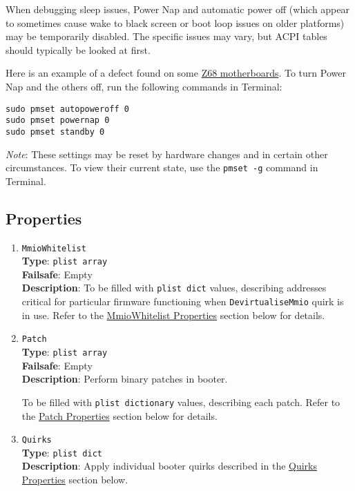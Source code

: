 \documentclass[]{article}
\begin{document}
When debugging sleep issues, Power Nap and automatic power off (which appear to sometimes cause
wake to black screen or boot loop issues on older platforms) may be temporarily disabled.
The specific issues may vary, but ACPI tables should typically be looked at first.

Here is an example of a defect found on some
\href{http://www.insanelymac.com/forum/topic/329624-need-cmos-reset-after-sleep-only-after-login/#entry2534645}{Z68 motherboards}.
To turn Power Nap and the others off, run the following commands in Terminal:
\begin{lstlisting}[label=powernap, style=ocbash]
sudo pmset autopoweroff 0
sudo pmset powernap 0
sudo pmset standby 0
\end{lstlisting}

\emph{Note}: These settings may be reset by hardware changes and in certain other circumstances.
To view their current state, use the \texttt{pmset -g} command in Terminal.

\subsection{Properties}\label{booterprops}

\begin{enumerate}

\item
  \texttt{MmioWhitelist}\\
  \textbf{Type}: \texttt{plist\ array}\\
  \textbf{Failsafe}: Empty\\
  \textbf{Description}: To be filled with \texttt{plist\ dict} values,
  describing addresses critical for particular firmware functioning when
  \texttt{DevirtualiseMmio} quirk is in use.
  Refer to the \hyperref[booterpropsmmio]{MmioWhitelist Properties} section below for details.

\item
  \texttt{Patch}\\
  \textbf{Type}: \texttt{plist\ array}\\
  \textbf{Failsafe}: Empty\\
  \textbf{Description}: Perform binary patches in booter.

  To be filled with \texttt{plist\ dictionary} values, describing each
  patch. Refer to the \hyperref[booterpropspatch]{Patch Properties} section below for details.

\item
  \texttt{Quirks}\\
  \textbf{Type}: \texttt{plist\ dict}\\
  \textbf{Description}: Apply individual booter quirks described
  in the \hyperref[booterpropsquirks]{Quirks Properties} section below.

\end{enumerate}
\end{document}
